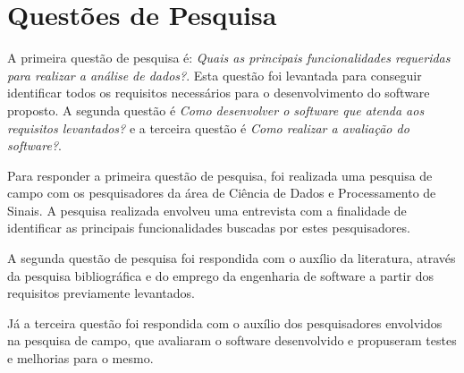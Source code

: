 \section{Questões de Pesquisa}
    \label{sec:questoes-de-pesquisa}

    A primeira questão de pesquisa é: \textit{Quais as principais funcionalidades requeridas para realizar a análise de dados?}. Esta questão foi levantada para conseguir identificar todos os requisitos necessários para o desenvolvimento do software proposto. A segunda questão é \textit{Como desenvolver o software que atenda aos requisitos levantados?} e a terceira questão é \textit{Como realizar a avaliação do software?}.

    Para responder a primeira questão de pesquisa, foi realizada uma pesquisa de campo com os pesquisadores da área de Ciência de Dados e Processamento de Sinais. A pesquisa realizada envolveu uma entrevista com a finalidade de identificar as principais funcionalidades buscadas por estes pesquisadores.

    A segunda questão de pesquisa foi respondida com o auxílio da literatura, através da pesquisa bibliográfica e do emprego da engenharia de software a partir dos requisitos previamente levantados.

    Já a terceira questão foi respondida com o auxílio dos pesquisadores envolvidos na pesquisa de campo, que avaliaram o software desenvolvido e propuseram testes e melhorias para o mesmo.
